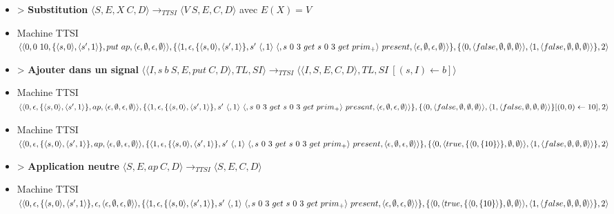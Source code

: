 \documentclass[10pt,a4paper]{report}
\begin{document}
\begin{itemize}
 				\item[] > \textbf{Substitution} $\langle S,E,X~C,D\rangle
 				\longrightarrow_{TTSI} 
 				\langle V~S,E,C,D\rangle$ avec $E(X) = V$
 				\item[] Machine TTSI $\langle\langle 0,0~10,\{\langle s,0\rangle,\langle s',1\rangle\},put~ap,\langle\epsilon,\emptyset,\epsilon,\emptyset\rangle\rangle,\{\langle 1,\epsilon,\{\langle s,0\rangle,\langle s',1\rangle\}, s'~\langle,1\rangle~\langle,s~0~3~get~s~0~3~get~prim_{+}\rangle~present ,\\\langle\epsilon,\emptyset,\epsilon,\emptyset\rangle\rangle\},\{\langle 0,\langle false,\emptyset,\emptyset,\emptyset\rangle\rangle,\langle 1,\langle false,\emptyset,\emptyset,\emptyset\rangle\rangle\},2\rangle$
 				\item[] > \textbf{Ajouter dans un signal} $\langle\langle I,s~b~S,E,put~C,D\rangle,TL,SI\rangle
 				\longrightarrow_{TTSI} 
 				\langle\langle I,S,E,C,D\rangle,TL,SI~[(s,I) \leftarrow b]\rangle$ 
 				\item[] Machine TTSI $\langle\langle 0,\epsilon,\{\langle s,0\rangle,\langle s',1\rangle\},ap,\langle\epsilon,\emptyset,\epsilon,\emptyset\rangle\rangle,\{\langle 1,\epsilon,\{\langle s,0\rangle,\langle s',1\rangle\}, s'~\langle,1\rangle~\langle,s~0~3~get~s~0~3~get~prim_{+}\rangle~present ,\\\langle\epsilon,\emptyset,\epsilon,\emptyset\rangle\rangle\},\{\langle 0,\langle false,\emptyset,\emptyset,\emptyset\rangle\rangle,\langle 1,\langle false,\emptyset,\emptyset,\emptyset\rangle\rangle\}[(0,0) \leftarrow 10],2\rangle$
 				\item[] Machine TTSI $\langle\langle 0,\epsilon,\{\langle s,0\rangle,\langle s',1\rangle\},ap,\langle\epsilon,\emptyset,\epsilon,\emptyset\rangle\rangle,\{\langle 1,\epsilon,\{\langle s,0\rangle,\langle s',1\rangle\}, s'~\langle,1\rangle~\langle,s~0~3~get~s~0~3~get~prim_{+}\rangle~present ,\\\langle\epsilon,\emptyset,\epsilon,\emptyset\rangle\rangle\},\{\langle 0,\langle true,\{\langle 0,\{10\}\rangle\},\emptyset,\emptyset\rangle\rangle,\langle 1,\langle false,\emptyset,\emptyset,\emptyset\rangle\rangle\},2\rangle$
 				\item[] > \textbf{Application neutre} $\langle S,E,ap~C,D\rangle
 				\longrightarrow_{TTSI} 
 				\langle S,E,C,D\rangle$
 				\item[] Machine TTSI $\langle\langle 0,\epsilon,\{\langle s,0\rangle,\langle s',1\rangle\},\epsilon,\langle\epsilon,\emptyset,\epsilon,\emptyset\rangle\rangle,\{\langle 1,\epsilon,\{\langle s,0\rangle,\langle s',1\rangle\}, s'~\langle,1\rangle~\langle,s~0~3~get~s~0~3~get~prim_{+}\rangle~present ,\\\langle\epsilon,\emptyset,\epsilon,\emptyset\rangle\rangle\},\{\langle 0,\langle true,\{\langle 0,\{10\}\rangle\},\emptyset,\emptyset\rangle\rangle,\langle 1,\langle false,\emptyset,\emptyset,\emptyset\rangle\rangle\},2\rangle$

\end{itemize}
\end{document}
